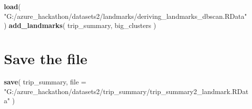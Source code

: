 \documentclass[]{article}
\newenvironment{Shaded}{\begin{snugshade}}{\end{snugshade}}
\newcommand{\DataTypeTok}[1]{\textcolor[rgb]{0.13,0.29,0.53}{#1}}
\newcommand{\KeywordTok}[1]{\textcolor[rgb]{0.13,0.29,0.53}{\textbf{#1}}}
\newcommand{\NormalTok}[1]{#1}
\newcommand{\StringTok}[1]{\textcolor[rgb]{0.31,0.60,0.02}{#1}}
\begin{document}
\begin{Shaded}
\begin{Highlighting}[]
\KeywordTok{load}\NormalTok{( }\StringTok{"G:/azure_hackathon/datasets2/landmarks/deriving_landmarks_dbscan.RData"}\NormalTok{ )}
\KeywordTok{add_landmarks}\NormalTok{( trip_summary, big_clusters )}
\end{Highlighting}
\end{Shaded}

\hypertarget{save-the-file}{%
\section{Save the file}\label{save-the-file}}

\begin{Shaded}
\begin{Highlighting}[]
\KeywordTok{save}\NormalTok{( trip_summary,}
    \DataTypeTok{file =} \StringTok{"G:/azure_hackathon/datasets2/trip_summary/trip_summary2_landmark.RData"}\NormalTok{ )}
\end{Highlighting}
\end{Shaded}
\end{document}
